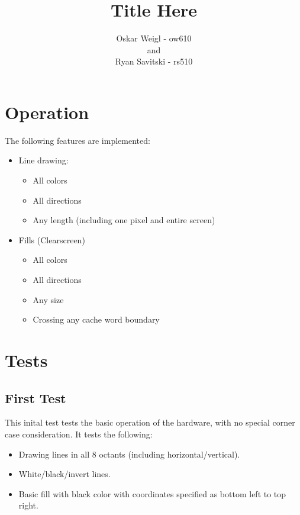 \documentclass[]{article}
\title{Title Here}
\author{Oskar Weigl - ow610\\ and \\ Ryan Savitski - rs510}
\begin{document}
\maketitle


\tableofcontents
\clearpage

\section{Operation}
The following features are implemented:
\begin{itemize}
	\item Line drawing:
	\begin{itemize}
		\item All colors
		\item All directions
		\item Any length (including one pixel and entire screen)
	\end{itemize}
	\item Fills (Clearscreen)
	\begin{itemize}
		\item All colors
		\item All directions
		\item Any size
		\item Crossing any cache word boundary
	\end{itemize}
\end{itemize}

\section{Tests} %
\label{sec:tests}

\subsection{First Test} %
\label{sub:first_test}

This inital test tests the basic operation of the hardware, with no special corner case consideration. It tests the following:
\begin{itemize}
	\item Drawing lines in all 8 octants (including horizontal/vertical).
	\item White/black/invert lines.
	\item Basic fill with black color with coordinates specified as bottom left to top right.
\end{itemize}
\end{document}
